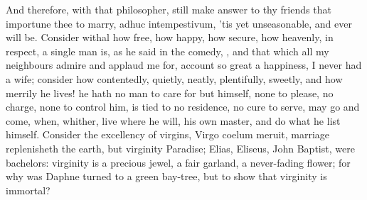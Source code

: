 {And therefore, with that philosopher, still make answer to thy friends
that importune thee to marry, adhuc intempestivum, 'tis yet
unseasonable, and ever will be.
Consider withal how free, how happy, how secure, how heavenly, in
respect, a single man is, as he said in the comedy, , and that which all my
neighbours admire and applaud me for, account so great a happiness, I
never had a wife; consider how contentedly, quietly, neatly,
plentifully, sweetly, and how merrily he lives! he hath no man to care
for but himself, none to please, no charge, none to control him, is
tied to no residence, no cure to serve, may go and come, when, whither,
live where he will, his own master, and do what he list himself.
Consider the excellency of virgins,  Virgo coelum meruit,
marriage replenisheth the earth, but virginity Paradise; Elias,
Eliseus, John Baptist, were bachelors: virginity is a precious jewel, a
fair garland, a never-fading flower; for why was Daphne turned to
a green bay-tree, but to show that virginity is immortal?

}

